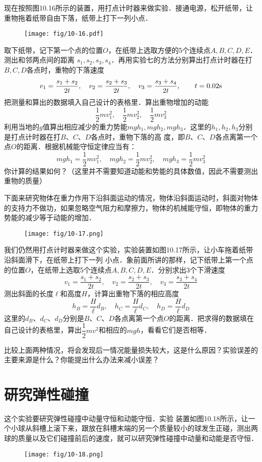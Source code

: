 现在按照图10.16所示的装置，用打点计时器来做实验．接通电源，松开纸带，让重物拖着纸带自由下落，纸带上打下一列小点．
\begin{figure}[htp]
    \centering
    \texttt{[image: fig/10-16.pdf]}
    \caption{}
\end{figure}

取下纸带，记下第一个点的位置$O$，在纸带上选取方便的5个连续点$A,B,C,D,E$．测出和邻两点间的距离
$s_1,s_2,s_3,s_4$．再用实验七的方法分别算出打点计时器在打$B,C,D$各点时，重物的下落速度
\[v_1=\frac{s_1+s_2}{2t},\quad v_2=\frac{s_2+s_3}{2t},\quad v_3=\frac{s_3+s_4}{2t},\qquad t=0.02{\rm s}\]
把测量和算出的数据填入自己设计的表格里．算出重物增加的动能
\[\frac{1}{2}mv_1^2, \quad \frac{1}{2}mv_2^2, \quad \frac{1}{2}mv_3^2\]
利用当地的$g$值算出相应减少的重力势能$mgh_1,mgh_2,mgh_3$．这里的$h_1,h_2,h_3$分别是打点计时器在打$B$、$C$、$D$各点时，重物下落的高
度，即$B$、$C$、$D$各点离第一个点$O$的距离．根据机械能守恒定律应当有：
\[mgh_1=\frac{1}{2}mv^2_1,\quad mgh_2=\frac{1}{2}mv^2_2,\quad mgh_3=\frac{1}{2}mv^2_3\]
你计算的结果如何？（这里并不需要知道动能和势能的具体数值，因此不需要测出重物的质量）

下面来研究物体在重力作用下沿斜面运动的情况，物体沿斜面运动时，斜面对物体的支持力不做功，如果忽略空气阻力和摩擦力，物体的机械能守恒，即物体的重力势能的减少等于动能的增加．

\begin{figure}[htp]
    \centering
    \texttt{[image: fig/10-17.png]}
    \caption{}
\end{figure}

我们仍然用打点计时器来做这个实验，实验装置如图10.17所示，让小车拖着纸带沿斜面滑下，在纸带上打下一列
小点．象前面所讲的那样，记下纸带上第一个点的位置$O$，在纸带上选取5个连续点$A,B,C,D,E$．分别求出3个下滑速度
\[v_1=\frac{s_1+s_2}{2t},\quad v_2=\frac{s_2+s_3}{2t},\quad v_3=\frac{s_3+s_4}{2t}\]
测出斜面的长度$\ell$和高度$H$，计算出重物下落的相应高度
\[h_B=\frac{H}{\ell}d_B, \quad h_C=\frac{H}{\ell}d_C, \quad h_D=\frac{H}{\ell}d_D \]
这里的$d_B$、$d_C$、$d_D$分别是$B$、$C$、$D$各点离第一个点$O$的距离．把求得的数据填在自己设计的表格里，算出$\dfrac{1}{2}mv^2$和相应的$mgh$，看看它们是否相等．

比较上面两种情况，将会发现后一情况能量损失较大，这是什么原因？实验误差的主要来源是什么？你能提出什么办法来减小误差？

\section{研究弹性碰撞}
这个实验要研究弹性碰撞中动量守恒和动能守恒．实验
装置如图10.18所示，让一个小球从斜槽上滚下来，跟放在斜槽末端的另一个质量较小的球发生正碰，测出两球的质量以及它们碰撞前后的速度，就可以研究弹性碰撞中动量和动能是否守恒．
\begin{figure}[htp]
    \centering
    \texttt{[image: fig/10-18.png]}
    \caption{}
\end{figure}


